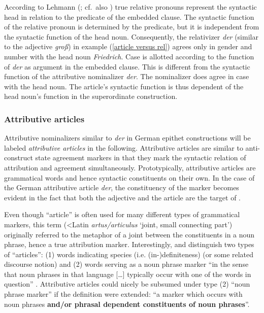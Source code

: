 According to Lehmann (\citeyear[230–231]{lehmann1984}; cf.~also \citealt[181]{himmelmann1997}) true relative pronouns represent the syntactic head in relation to the predicate of the embedded clause. The syntactic function of the relative pronoun is determined by the predicate, but it is independent from the syntactic function of the head noun. Consequently, the relativizer \textit{der} (similar to the adjective \textit{groß}) in example (\ref{article versus rel}) agrees only in gender and number with the head noun \textit{Friedrich}. Case is allotted according to the function of \textit{der} as argument in the embedded clause. This is different from the syntactic function of the attributive nominalizer \textit{der}. The nominalizer does agree in case with the head noun. The article's syntactic function is thus dependent of the head noun's function in the superordinate construction.

\subsubsection{Attributive articles} \label{attr art}
Attributive nominalizers similar to \textit{der} in German epithet constructions will be labeled \emph{attributive articles} in the following. Attributive articles are similar to anti\hyp{}construct state agreement markers in that they mark the syntactic relation of attribution and agreement simultaneously. Prototypically, attributive articles are grammatical words and hence syntactic constituents on their own. In the case of the German attributive article \textit{der}, the constituency of the marker becomes evident in the fact that both the adjective and the article are the target of .

Even though “article” is often used for many different types of grammatical markers, this term (<Latin \emph{artus\slash{}articulus} ‘joint, small connecting part’) originally referred to the metaphor of a joint between the constituents in a noun phrase, hence a true attribution marker. Interestingly, \citet[83]{dryer1989a} and \citet{rijkhoff2002} distinguish two types of “articles”: (1) words indicating species (i.e. (in-)definiteness) (or some related discourse notion) and (2) words serving as a noun phrase marker “in the sense that noun phrases in that language [\dots] typically occur with one of the words in question” \citep[285]{rijkhoff2002}. Attributive articles could nicely be subsumed under type (2) “noun phrase marker” if the definition were extended: “a marker which occurs with noun phrases \textbf{and\slash{}or phrasal dependent constituents of noun phrases}”.

